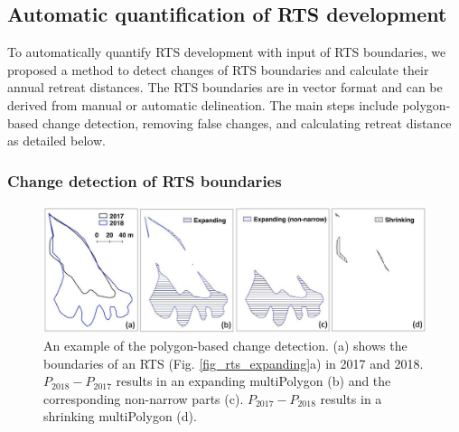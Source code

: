 \documentclass[authoryear,preprint,review,12pt]{elsarticle}
\begin{document}
\subsection{Automatic quantification of RTS development}
\label{sec_auto_rts_develop}

To automatically quantify RTS development with input of RTS boundaries, we proposed a method to detect changes of RTS boundaries and calculate their annual retreat distances.
The RTS boundaries are in vector format and can be derived from manual or automatic delineation. 
The main steps include polygon-based change detection, removing false changes, and calculating retreat distance as detailed below. 

\subsubsection{Change detection of RTS boundaries}
\label{sec_polygon_change_det}

\begin{figure} 
	\centering
	\includegraphics[width=14cm]{figs/rts_polygon_change_det_trim.jpg}
	\caption{An example of the polygon-based change detection. (a) shows the boundaries of an RTS (Fig. \ref{fig_rts_expanding}a) in 2017 and 2018. $P_{2018}-P_{2017}$ results in an expanding multiPolygon (b) and the corresponding non-narrow parts (c). $P_{2017}-P_{2018}$ results in a shrinking multiPolygon (d).}
	\label{fig_rts_change_det}
\end{figure}
\end{document}

